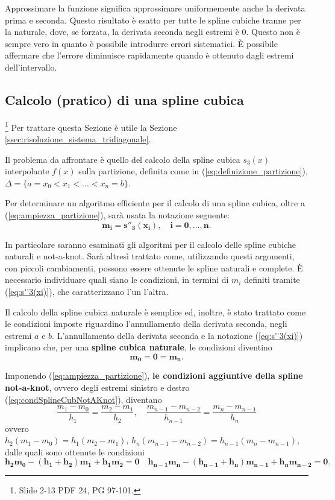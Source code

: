 Approssimare la funzione significa approssimare uniformemente anche la derivata prima e seconda. Questo risultato è esatto per tutte le spline cubiche tranne per la naturale, dove, se forzata, la derivata seconda negli estremi è 0. Questo non è sempre vero in quanto è possibile introdurre errori sistematici. È possibile affermare che l'errore diminuisce rapidamente quando è ottenuto dagli estremi dell'intervallo.

\subsection{Calcolo (pratico) di una spline cubica}\label{ssec:calcolo_spline_cubiche}\footnote{Slide 2-13 PDF 24, PG 97-101.}
Per trattare questa Sezione è utile la Sezione \ref{ssec:risoluzione_sistema_tridiagonale}.

Il problema da affrontare è quello del calcolo della spline cubica $s_3(x)$ interpolante $f(x)$ sulla partizione, definita come in (\ref{eq:definizione_partizione}), $\Delta=\{a=x_0<x_1<\hdots<x_n=b\}$.

Per determinare un algoritmo efficiente per il calcolo di una spline cubica, oltre a (\ref{eq:ampiezza_partizione}), sarà usata la notazione seguente:
\begin{equation}\label{eq:s''3(xi)}
    \boldsymbol{m_i=s''_3(x_i),\quad i=0,\hdots,n.}
\end{equation}

In particolare saranno esaminati gli algoritmi per il calcolo delle spline cubiche naturali e not-a-knot. Sarà altresì trattato come, utilizzando questi argomenti, con piccoli cambiamenti, possono essere ottenute le spline naturali e complete. È necessario individuare quali siano le condizioni, in termini di $m_i$ definiti tramite (\ref{eq:s''3(xi)}), che caratterizzano l'un l'altra.

Il calcolo della spline cubica naturale è semplice ed, inoltre, è stato trattato come le condizioni imposte riguardino l'annullamento della derivata seconda, negli estremi $a$ e $b$. L'annullamento della derivata seconda e la notazione (\ref{eq:s''3(xi)}) implicano che, per una \textbf{spline cubica naturale}, le condizioni diventino
\begin{equation}\label{eq:condSplineNat}
    \boldsymbol{m_0=0=m_n}.
\end{equation}

Imponendo (\ref{eq:ampiezza_partizione}), \textbf{le condizioni aggiuntive della spline not-a-knot}, ovvero degli estremi sinistro e destro (\ref{eq:condSplineCubNotAKnot}), diventano
\begin{equation*}
    \frac{m_1-m_0}{h_1}=\frac{m_2-m_1}{h_2},\quad \frac{m_{n-1}-m_{n-2}}{h_{n-1}}=\frac{m_n-m_{n-1}}{h_n}
\end{equation*}
ovvero $h_2(m_1-m_0)=h_1(m_2-m_1),\, h_{n}(m_{n-1}-m_{n-2})=h_{n-1}(m_{n}-m_{n-1})$, dalle quali sono ottenute le condizioni
\begin{equation}\label{eq:condSplineCubNotAKnot2}
    \boldsymbol{h_2m_0-(h_1+h_2)m_1+h_1m_2=0}\quad\boldsymbol{h_{n-1}m_n-(h_{n-1}+h_n)m_{n-1}+h_nm_{n-2}=0}.
\end{equation}

